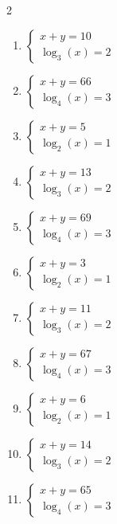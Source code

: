 \documentclass[12pt,a4paper]{article}
\begin{document}
\begin{multicols}{2}
\begin{enumerate}[leftmargin=*, itemsep=6pt]
\item \(\begin{cases} x+y=10\\ \log_{3}\left(x\right)=2\end{cases}\)

\item \(\begin{cases} x+y=66\\ \log_{4}\left(x\right)=3\end{cases}\)

\item \(\begin{cases} x+y=5\\ \log_{2}\left(x\right)=1\end{cases}\)

\item \(\begin{cases} x+y=13\\ \log_{3}\left(x\right)=2\end{cases}\)

\item \(\begin{cases} x+y=69\\ \log_{4}\left(x\right)=3\end{cases}\)

\item \(\begin{cases} x+y=3\\ \log_{2}\left(x\right)=1\end{cases}\)

\item \(\begin{cases} x+y=11\\ \log_{3}\left(x\right)=2\end{cases}\)

\item \(\begin{cases} x+y=67\\ \log_{4}\left(x\right)=3\end{cases}\)

\item \(\begin{cases} x+y=6\\ \log_{2}\left(x\right)=1\end{cases}\)

\item \(\begin{cases} x+y=14\\ \log_{3}\left(x\right)=2\end{cases}\)

\item \(\begin{cases} x+y=65\\ \log_{4}\left(x\right)=3\end{cases}\)

\end{enumerate}
\end{multicols}
\newpage
\end{document}
